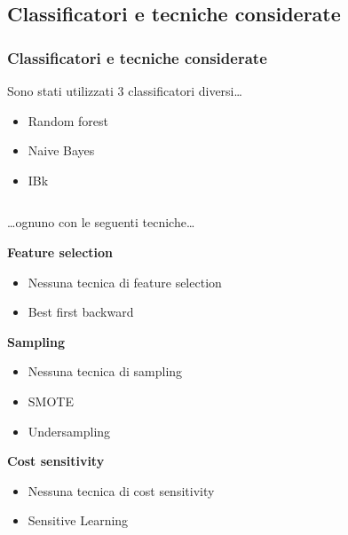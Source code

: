 \documentclass{beamer}
\begin{document}
\subsection{Classificatori e tecniche considerate}
\begin{frame}
	\frametitle{Classificatori e tecniche considerate}
	
	\fontsize{7pt}{8pt}\selectfont
	
	Sono stati utilizzati 3 classificatori diversi\dots
	\begin{itemize}
		\item Random forest
		\item Naive Bayes
		\item IBk
	\end{itemize}
	
	\begin{columns}[T]
		\begin{column}{0.5\linewidth}
		\dots ognuno con le seguenti tecniche\dots
		
		\textbf{Feature selection}
		\begin{itemize}
			\item Nessuna tecnica di feature selection
			\item Best first backward
		\end{itemize}
	
		\textbf{Sampling}
		\begin{itemize}
			\item Nessuna tecnica di sampling
			\item SMOTE
			\item Undersampling
		\end{itemize}
	
		\textbf{Cost sensitivity}
		\begin{itemize}
			\item Nessuna tecnica di cost sensitivity
			\item Sensitive Learning
		\end{itemize}
		\end{column}
	

\end{columns}
\end{frame}
\end{document}
